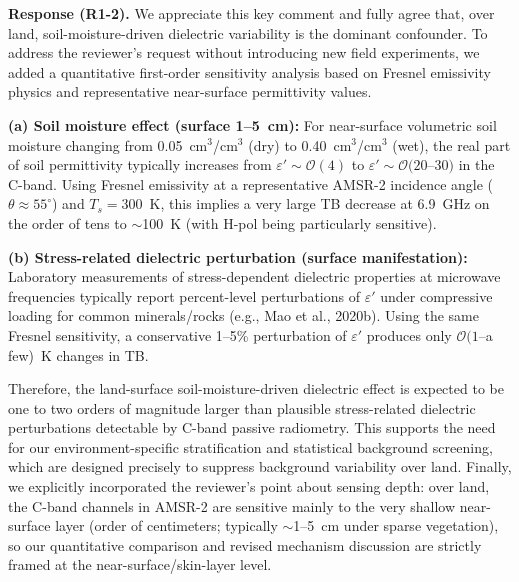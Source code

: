 \documentclass[11pt]{article}
\newcommand{\revresponse}[1]{\begingroup\color{responsecolor}#1\endgroup}
\begin{document}
\revresponse{%
\textbf{Response (R1-2).}
We appreciate this key comment and fully agree that, over land, soil-moisture-driven dielectric variability is the dominant confounder. To address the reviewer’s request without introducing new field experiments, we added a quantitative first-order sensitivity analysis based on Fresnel emissivity physics and representative near-surface permittivity values.

\medskip

\textbf{(a) Soil moisture effect (surface 1--5~cm):} For near-surface volumetric soil moisture changing from 0.05~cm$^3$/cm$^3$ (dry) to 0.40~cm$^3$/cm$^3$ (wet), the real part of soil permittivity typically increases from $\varepsilon' \sim \mathcal{O}(4)$ to $\varepsilon' \sim \mathcal{O}(20$--$30)$ in the C-band. Using Fresnel emissivity at a representative AMSR-2 incidence angle ($\theta \approx 55^\circ$) and $T_s = 300$~K, this implies a very large TB decrease at 6.9~GHz on the order of tens to $\sim$100~K (with H-pol being particularly sensitive).

\medskip

\textbf{(b) Stress-related dielectric perturbation (surface manifestation):} Laboratory measurements of stress-dependent dielectric properties at microwave frequencies typically report percent-level perturbations of $\varepsilon'$ under compressive loading for common minerals/rocks (e.g., Mao et al., 2020b). Using the same Fresnel sensitivity, a conservative 1--5\% perturbation of $\varepsilon'$ produces only $\mathcal{O}(1$--a few)~K changes in TB.

\medskip

Therefore, the land-surface soil-moisture-driven dielectric effect is expected to be one to two orders of magnitude larger than plausible stress-related dielectric perturbations detectable by C-band passive radiometry. This supports the need for our environment-specific stratification and statistical background screening, which are designed precisely to suppress background variability over land. Finally, we explicitly incorporated the reviewer’s point about sensing depth: over land, the C-band channels in AMSR-2 are sensitive mainly to the very shallow near-surface layer (order of centimeters; typically $\sim$1--5~cm under sparse vegetation), so our quantitative comparison and revised mechanism discussion are strictly framed at the near-surface/skin-layer level.
}
\end{document}
